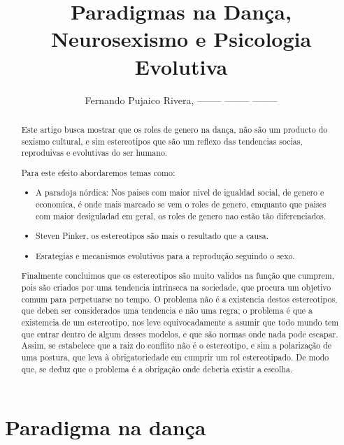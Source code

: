 \documentclass[a4paper,10pt]{article}
\title{Paradigmas na Dança, Neurosexismo e Psicologia Evolutiva}
\author{Fernando Pujaico Rivera, -------- -------- --------}
\begin{document}
\maketitle

\begin{abstract}

Este artigo busca mostrar que os roles de genero na dança,
não são um producto do sexismo cultural, 
e sim estereotipos que são um reflexo das tendencias socias, 
reproduivas e evolutivas do ser humano.

Para este efeito abordaremos temas como:

\begin{itemize}
\item A paradoja nórdica: Nos paises com maior nivel de igualdad social, 
de genero e economica, é onde mais marcado se vem o roles de genero,
emquanto que paises com maior desiguladad em geral,
os roles de genero nao estão tão diferenciados.

\item Steven Pinker, os estereotipos são mais o resultado que a causa.

\item Esrategias e mecanismos evolutivos para a reprodução seguindo o sexo.

\end{itemize}
Finalmente concluimos que os estereotipos são muito validos na função que cumprem, 
pois são criados por uma tendencia intrinseca na sociedade,
que procura um objetivo comum para perpetuarse no tempo. 
O problema não é a existencia destos estereotipos, 
que deben ser considerados uma tendencia e não uma regra;
o problema é que a existemcia de um estereotipo, 
nos leve equivocadamente a asumir que todo mundo tem que entrar dentro de algum desses modelos,
e que são normas onde nada pode escapar.
Assim, se estabelece que a raiz do conflito não é o estereotipo, 
e sim a polarização de uma postura, 
que leva à obrigatoriedade em cumprir um rol estereotipado.
De modo que, se deduz que o problema é a obrigação onde deberia existir a escolha.

\end{abstract}


\section{Paradigma na dança}
\end{document}
